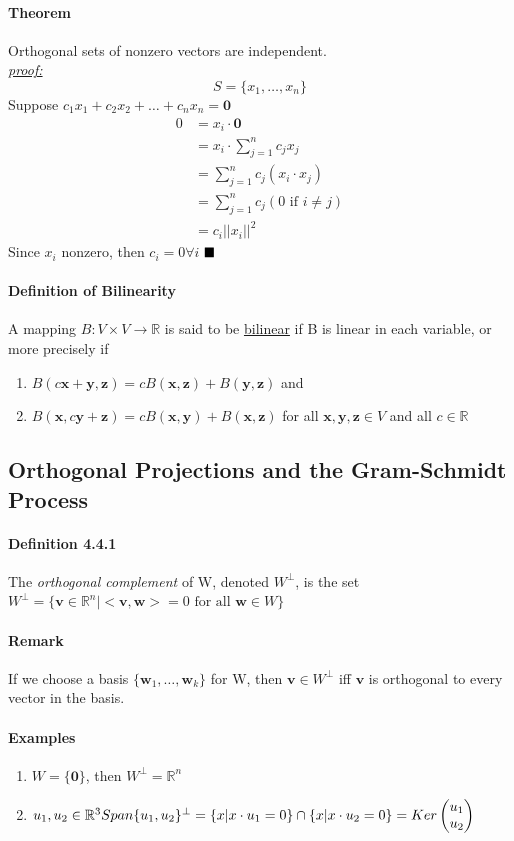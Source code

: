 \documentclass[11pt]{article}
\newcommand{\ti}[1]{\textit{#1}}
\newcommand{\tb}[1]{\textbf{#1}}
\newcommand{\under}[1]{\underline{#1}}
\newcommand{\proof}[0]{\textit{\underline{proof:} }}
\newcommand{\qed}[0]{$\hfill\blacksquare$}
\newcommand{\real}[0]{\mathbb{R}}
\newcommand{\vx}[0]{\tb{x}}
\newcommand{\vy}[0]{\tb{y}}
\newcommand{\vz}[0]{\tb{z}}
\newcommand{\vo}[0]{\tb{0}}
\newcommand{\vw}[0]{\tb{w}}
\newcommand{\vv}[0]{\tb{v}}
\begin{document}
{\paragraph{Theorem} Orthogonal sets of nonzero vectors are independent.\\
\proof 
	$$S = \{x_1, \hdots, x_n\}$$
Suppose $c_1x_1 + c_2x_2 + \hdots + c_nx_n = \vo$
\begin{align*}
	0 &= x_i \cdot \vo \\
	&= x_i \cdot \sum_{j=1}^n c_jx_j \\
	&= \sum_{j=1}^n c_j(x_i\cdot x_j)\\
	&= \sum_{j=1}^n c_j(0 \mbox { if } i \neq j) \\
	&= c_i ||x_i||^2
\end{align*}
Since $x_i$ nonzero, then $c_i = 0 \forall i$
\qed

\paragraph{Definition of Bilinearity}
A mapping $B: V \times V \rightarrow \real$ is said to be \under{bilinear} if B is linear in each variable, or more precisely if
\begin{enumerate}
	\item $B(c\vx+\vy,\vz) = cB(\vx, \vz) + B(\vy, \vz)$ and
	\item $B(\vx, c\vy + \vz) = cB(\vx, \vy) + B(\vx, \vz)$ for all $\vx, \vy, \vz \in V$ and all $c \in \real$
\end{enumerate}

\subsection{Orthogonal Projections and the Gram-Schmidt Process}
\paragraph{Definition 4.4.1} The \ti{orthogonal complement} of W, denoted $W^{\perp}$, is the set $W^{\perp} = \{ \vv \in \real^n|<\vv,\vw> = 0 \mbox{ for all } \vw \in W \}$
\paragraph{Remark}If we choose a basis $\{\vw_1,\hdots,\vw_k\}$ for W, then $\vv \in W^\perp$ iff $\vv$ is orthogonal to every vector in the basis.
\paragraph{Examples}
\begin{enumerate}
	\item $W = \{\vo\}$, then $W^\perp = \real^n$
	\item $u_1, u_2 \in \real^3\\ Span\{u_1, u_2\}^\perp = \{x|x\cdot u_1 = 0\} \cap \{x|x\cdot u_2 = 0\} = Ker\begin{pmatrix}u_1\\u_2\end{pmatrix}$
\end{enumerate}
}
\end{document}
